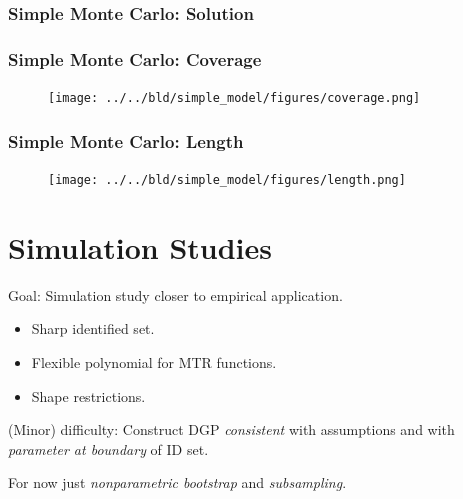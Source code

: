 \documentclass[11pt, aspectratio=169]{beamer}
\begin{document}
\begin{frame}
    \frametitle{Simple Monte Carlo: Solution}


\end{frame}

\begin{frame}
    \frametitle{Simple Monte Carlo: Coverage}

    \begin{figure}
        \texttt{[image: ../../bld/simple\_model/figures/coverage.png]}
    \end{figure}

\end{frame}

\begin{frame}
    \frametitle{Simple Monte Carlo: Length}

    \begin{figure}
        \texttt{[image: ../../bld/simple\_model/figures/length.png]}
    \end{figure}

\end{frame}

\section{Simulation Studies}

\begin{frame}
    Goal: Simulation study closer to empirical application.

    \vspace{0.5cm}

    \begin{itemize}
        \item Sharp identified set.
        \item Flexible polynomial for MTR functions.
        \item Shape restrictions.
    \end{itemize}

    \pause

    \vspace{0.5cm}

    (Minor) difficulty: Construct DGP \textit{consistent} with assumptions and with \textit{parameter at boundary} of ID set.

    \vspace{0.5cm}

    For now just \textit{nonparametric bootstrap} and \textit{subsampling}.

\end{frame}
\end{document}
